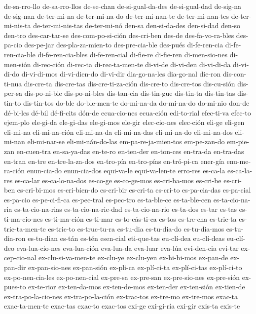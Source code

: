 {de-sa-rro-llo de-sa-rro-llos de-se-chan de-si-gual-da-des de-si-gual-dad de-sig-na de-sig-nan de-ter-mi-na
de-ter-mi-na-do de-ter-mi-nan-te de-ter-mi-nan-tes de-ter-mi-nis-ta de-ter-mi-nis-tas de-ter-mi-nó den-sa
den-si-da-des den-si-dad den-so den-tro des-car-tar-se des-com-po-si-ción des-cri-ben des-de
des-fa-vo-ra-bles des-pa-cio des-pe-jar des-pla-za-mien-to des-pre-cia-ble des-pués di-fe-ren-cia
di-fe-ren-cia-ble di-fe-ren-cia-bles di-fe-ren-cial di-fie-re di-fie-ren di-men-sio-nes di-men-sión
di-rec-ción di-rec-ta di-rec-ta-men-te di-vi-de di-vi-den di-vi-di-da di-vi-di-do di-vi-di-mos di-vi-dien-do
di-vi-dir dia-go-na-les dia-go-nal die-ron dis-con-ti-nua dis-cre-ta dis-cre-tas dis-cre-ti-za-ción
dis-cre-to dis-cre-tos dis-cu-sión dis-per-sa dis-po-ni-ble dis-po-ni-bles dis-tan-cia dis-tin-gue
dis-tin-ta dis-tin-tas dis-tin-to dis-tin-tos do-ble do-ble-men-te do-mi-na-da do-mi-na-do do-mi-nio don-de
dé-bi-les dé-bil dé-fi-cits dón-de ecua-cio-nes ecua-ción edi-to-rial efec-ti-va efec-to ejem-plo ele-gi-da
ele-gi-das ele-gi-mos ele-gir elec-cio-nes elec-ción eli-ge eli-gen eli-mi-na eli-mi-na-ción eli-mi-na-da
eli-mi-na-das eli-mi-na-do eli-mi-na-dos eli-mi-nan eli-mi-nar-se eli-mi-nán-do-las em-pa-re-ja-mien-tos
em-pe-zan-do em-pie-zan en-cuen-tra en-sa-ya-das en-te-ro en-ten-der en-ton-ces en-tra-da en-tra-das en-tran
en-tre en-tre-la-za-dos en-tro-pía en-tro-pías en-tró-pi-ca ener-gía enu-me-ra-ción enun-cia-do enun-cia-dos
equi-va-le equi-va-len-te erro-res es-ca-la es-ca-la-res es-ca-lar es-ca-lo-na-dos es-co-ge es-co-ge-mos
es-cri-ba-mos es-cri-be es-cri-ben es-cri-bi-mos es-cri-bien-do es-cri-bir es-cri-ta es-cri-to es-pa-cia-das
es-pa-cial es-pa-cio es-pe-ci-fi-ca es-pec-tral es-pec-tro es-ta-ble-ce es-ta-ble-cen es-ta-cio-na-ria
es-ta-cio-na-rias es-ta-cio-na-rie-dad es-ta-cio-na-rio es-ta-dos es-tar es-tas es-ti-ma-cio-nes
es-ti-ma-ción es-ti-mar es-to-cás-ti-ca es-tos es-tre-cha es-tric-ta es-tric-ta-men-te es-tric-to
es-truc-tu-ra es-tu-dia es-tu-dia-do es-tu-dia-mos es-tu-dia-ron es-tu-dian es-tán es-tén esen-cial
eti-que-tas eu-clí-dea eu-clí-deas eu-clí-deo eva-lua-cio-nes eva-lua-ción eva-lua-da eva-luar eva-lúa
evi-den-cia evi-tar ex-cep-cio-nal ex-clu-si-va-men-te ex-clu-ye ex-clu-yen ex-hi-bi-mos ex-pan-de
ex-pan-dir ex-pan-sio-nes ex-pan-sión ex-pli-ca ex-plí-ci-ta ex-plí-ci-tas ex-plí-ci-to ex-po-nen-cia-les
ex-po-nen-cial ex-pre-sa ex-pre-san ex-pre-sio-nes ex-pre-sión ex-pues-to ex-te-rior ex-ten-da-mos
ex-ten-de-mos ex-ten-der ex-ten-sión ex-tien-de ex-tra-po-la-cio-nes ex-tra-po-la-ción ex-trac-tos ex-tre-mo
ex-tre-mos exac-ta exac-ta-men-te exac-tas exac-to exac-tos exi-ge exi-gi-ría exi-gir exis-ta exis-te
}
